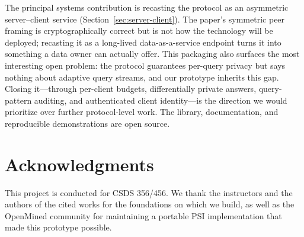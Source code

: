 \documentclass[sigconf]{acmart}
\begin{document}
The principal systems contribution is recasting the protocol as an asymmetric server--client service (Section~\ref{sec:server-client}). The paper's symmetric peer framing is cryptographically correct but is not how the technology will be deployed; recasting it as a long-lived data-as-a-service endpoint turns it into something a data owner can actually offer. This packaging also surfaces the most interesting open problem: the protocol guarantees per-query privacy but says nothing about adaptive query streams, and our prototype inherits this gap. Closing it---through per-client budgets, differentially private answers, query-pattern auditing, and authenticated client identity---is the direction we would prioritize over further protocol-level work. The library, documentation, and reproducible demonstrations are open source.

\section*{Acknowledgments}
This project is conducted for CSDS 356/456. We thank the instructors and the authors of the cited works for the foundations on which we build, as well as the OpenMined community for maintaining a portable PSI implementation that made this prototype possible.



\end{document}

